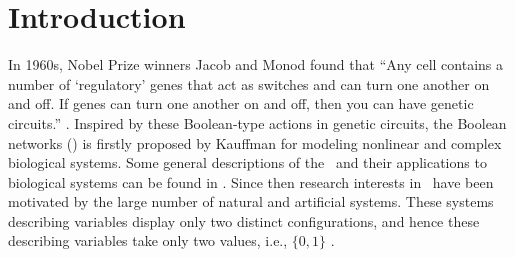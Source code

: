 \section{Introduction}
\label{sec:intro}

In 1960s, Nobel Prize winners Jacob and Monod found that ``Any cell contains a number of `regulatory' genes that act as switches and can turn one another on and off. If genes can turn one another on and off, then you can have genetic circuits.'' \cite{Jacob1961Genetic}. Inspired by these Boolean-type actions in genetic circuits, the Boolean networks (\BNs) is firstly proposed by Kauffman \cite{Kauffman1968Metabolic} for modeling nonlinear and complex biological systems. Some general descriptions of the \BNs\ and their applications to biological systems can be found in \cite{Kauffman1968Metabolic}. Since then research interests in  \BNs\ have been motivated by the large number of natural and artificial systems. These systems describing variables display only two distinct configurations, and hence these describing variables take only two values, i.e., $\{0,1\}$  \cite{Akutsu2000Inferring, Shmulevich2002From, Faur2006Dynamical,Green2007The,Lou2010Multi,Fornasini2013Observability}.


